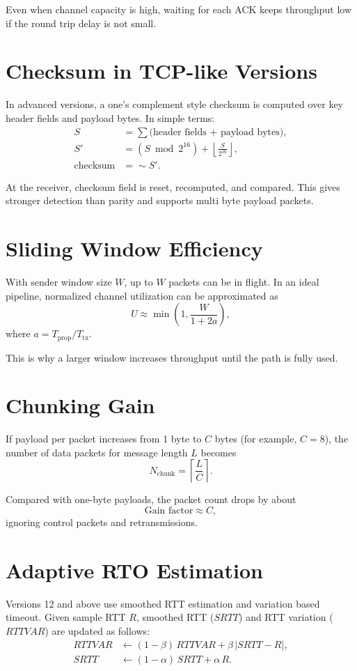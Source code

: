 Even when channel capacity is high, waiting for each ACK keeps throughput low
if the round trip delay is not small.

\section{Checksum in TCP-like Versions}
In advanced versions, a one's complement style checksum is computed over key
header fields and payload bytes. In simple terms:
\begin{align}
S &= \sum \text{(header fields + payload bytes)}, \\
S' &= (S \bmod 2^{16}) + \left\lfloor\frac{S}{2^{16}}\right\rfloor, \\
\text{checksum} &= \sim S'.
\end{align}

At the receiver, checksum field is reset, recomputed, and compared. This gives
stronger detection than parity and supports multi byte payload packets.

\section{Sliding Window Efficiency}
With sender window size $W$, up to $W$ packets can be in flight. In an ideal
pipeline, normalized channel utilization can be approximated as
\begin{equation}
U \approx \min\left(1, \frac{W}{1 + 2a}\right),
\end{equation}
where $a = T_{\text{prop}}/T_{\text{tx}}$.

This is why a larger window increases throughput until the path is fully used.

\section{Chunking Gain}
If payload per packet increases from 1 byte to $C$ bytes (for example,
$C=8$), the number of data packets for message length $L$ becomes
\begin{equation}
N_{\text{chunk}} = \left\lceil\frac{L}{C}\right\rceil.
\end{equation}

Compared with one-byte payloads, the packet count drops by about
\begin{equation}
\text{Gain factor} \approx C,
\end{equation}
ignoring control packets and retransmissions.

\clearpage
\section{Adaptive RTO Estimation}
Versions 12 and above use smoothed RTT estimation and variation based timeout.
Given sample RTT $R$, smoothed RTT ($SRTT$) and RTT variation ($RTTVAR$) are
updated as follows:
\begin{align}
RTTVAR &\leftarrow (1-\beta)\,RTTVAR + \beta\,|SRTT - R|, \\
SRTT   &\leftarrow (1-\alpha)\,SRTT + \alpha\,R.
\end{align}

